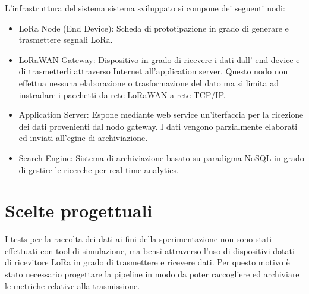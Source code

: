 \documentclass[12pt,a4paper,openright,twoside]{report}
\begin{document}
L'infrastruttura del sistema sistema sviluppato si compone dei seguenti nodi:
\begin{itemize}                       
\item LoRa Node (End Device): Scheda di prototipazione in grado di generare e trasmettere segnali LoRa.   
\item LoRaWAN Gateway: Dispositivo in grado di ricevere i dati dall' end device e di trasmetterli attraverso Internet all'application server. Questo nodo non effettua nessuna elaborazione o trasformazione del dato ma si limita ad instradare i pacchetti da rete LoRaWAN a rete TCP/IP.  
\item Application Server: Espone mediante web service un'iterfaccia per la ricezione dei dati provenienti dal nodo gateway. I dati vengono parzialmente elaborati ed inviati all'egine di archiviazione.
\item Search Engine: Sistema di archiviazione basato su paradigma NoSQL in grado di gestire le ricerche per real-time analytics.  
\end{itemize}

 \section{Scelte progettuali}
I tests per la raccolta dei dati ai fini della sperimentazione non sono stati effettuati con tool di simulazione, ma bens\`i attraverso l'uso di dispositivi dotati di ricevitore LoRa in grado di trasmettere e ricevere dati. 
Per questo motivo \`e stato necessario progettare la pipeline in modo da poter raccogliere ed archiviare le metriche relative alla trasmissione.
\end{document}
